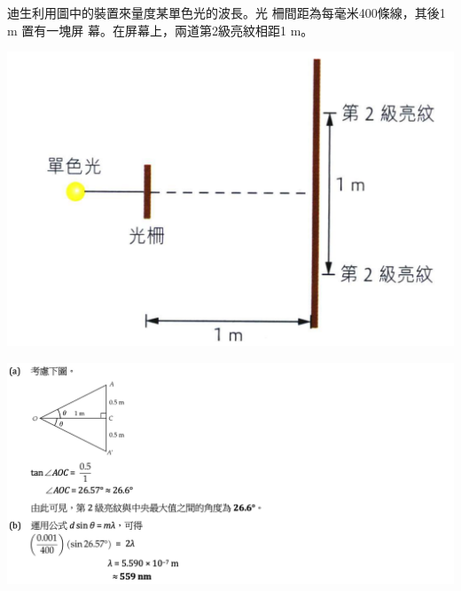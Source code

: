 {
    迪生利用圖中的裝置來量度某單色光的波長。光 柵間距為每毫米400條線，其後1 m 置有一塊屏 幕。在屏幕上，兩道第2級亮紋相距1 m。
    \par{\par\centering\includegraphics[width=.4\textwidth]{./img/ch4_earlyclass_wave_lq_2024-05-14-14-06-10.png}\par}
}{
    \sol\par{\par\centering\includegraphics[width=\textwidth]{./img/ch4_earlyclass_wave_lq_2024-05-14-14-07-38.png}\par}
}
